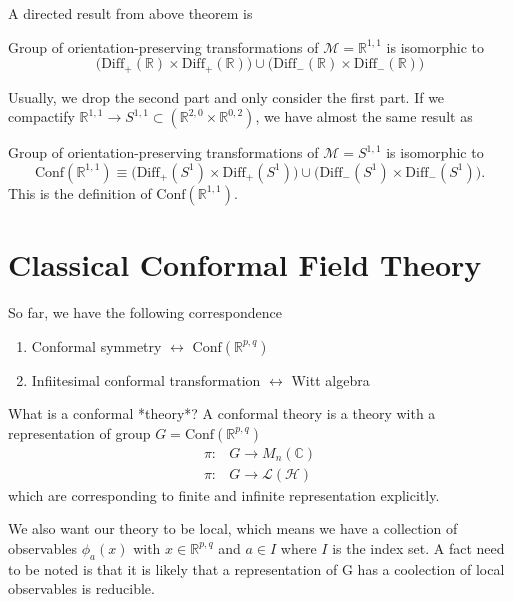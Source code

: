 \documentclass[a4paper,11pt]{article}
\begin{document}
A directed result from above theorem is
\begin{framed}
Group of orientation-preserving transformations of $\mathcal{M}=\mathbb{R}^{1,1}$ is isomorphic to
\begin{equation*}
    \bigg(\mathrm{Diff}_+(\mathbb{R})\times\mathrm{Diff}_+(\mathbb{R})\bigg)\cup\bigg(\mathrm{Diff}_-(\mathbb{R})\times\mathrm{Diff}_-(\mathbb{R})\bigg)
\end{equation*}
\end{framed}
Usually, we drop the second part and only consider the first part. If we compactify $\mathbb{R}^{1,1}\rightarrow S^{1,1}\subset(\mathbb{R}^{2,0}\times\mathbb{R}^{0,2})$, we have almost the same result as
\begin{framed}
Group of orientation-preserving transformations of $\mathcal{M}=S^{1,1}$ is isomorphic to
\begin{equation*}
    \mathrm{Conf}(\mathbb{R}^{1,1})\equiv\bigg(\mathrm{Diff}_+(S^1)\times\mathrm{Diff}_+(S^1)\bigg)\cup\bigg(\mathrm{Diff}_-(S^1)\times\mathrm{Diff}_-(S^1)\bigg).
\end{equation*}
This is the definition of $\mathrm{Conf}(\mathbb{R}^{1,1})$.
\end{framed}

\newpage

\section{Classical Conformal Field Theory}
So far, we have the following correspondence 
\begin{enumerate}
    \item Conformal symmetry $\leftrightarrow$ $\mathrm{Conf}(\mathbb{R}^{p,q})$
    \item Infiitesimal conformal transformation $\leftrightarrow$ Witt algebra
\end{enumerate}

What is a conformal *theory*? A conformal theory is a theory with a representation of group $G=\mathrm{Conf}(\mathbb{R}^{p,q})$
\begin{equation*}
\begin{aligned}
\pi:&G\rightarrow M_n(\mathbb{C})\\
\pi:&G\rightarrow \mathcal{L}(\mathcal{H})
\end{aligned}
\end{equation*}
which are corresponding to finite and infinite representation explicitly.

We also want our theory to be local, which means we have a collection of observables $\phi_a(x)$ with $x\in\mathbb{R}^{p,q}$ and $a\in I$ where $I$ is the index set. A fact need to be noted is that it is likely that a representation of G has a coolection of local observables is reducible.
\end{document}
